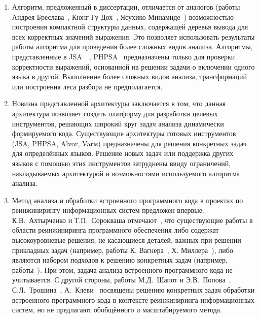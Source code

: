 \begin{enumerate}

\item Алгоритм, предложенный в диссертации, отличается от аналогов (работы Андрея Бреслава~\cite{Alvor1, Alvor2}, Кюнг-Гу Дох~\cite{LrAbstract1, LrAbstract2}, Ясухико Минамиде~\cite{PHPSA}) возможностью построения компактной структуры данных, содержащей деревья вывода для всех корректных значений выражения. Это позволяет использовать результаты работы алгоритма для проведения более сложных видов анализа. Алгоритмы, представленные в JSA~\cite{JSA}~\cite{Alvor1, Alvor2}, PHPSA~\cite{PHPSA} предназначены только для проверки корректности выражений, основанной на решении задачи о включении одного языка в другой. Выполнение более сложных видов анализа, трансформаций или построения леса разбора не предполагается. 

\item Новизна представленной архитектуры заключается в том, что данная архитектура позволяет создать платформу для разработки целевых инструментов, решающих широкий круг задач анализа динамически формируемого кода. Существующие архитектуры готовых инструментов (JSA, PHPSA, Alvor, Varis) предназначены для решения конкретных задач для определённых языков. Решение новых задач или поддержка других языков с помощью этих инструментов затруднены ввиду ограничений, накладываемых архитектурой и возможностями используемого алгоритма анализа. 

\item Метод анализа и обработки встроенного программного кода в проектах по реинжинирингу информационных систем предложен впервые. К.В.~Ахтырченко и Т.П.~Сорокваша отмечают~\cite{SoftwareReengMethods}, что существующие работы в области реинжиниринга программного обеспечения либо содержат высокоуровневые решения, не касающиеся деталей, важных при решении прикладных задач (например, работы К. Вагнера~\cite{SoftwareReeng3}, Х. Миллера~\cite{SoftwareReeng2}), либо являются набором подходов к решению конкретных задач (например, работы~\cite{SoftwareReeng1, reengANT, boulychev}). При этом, задача анализа встроенного программного кода не учитывается. С другой стороны, работы М.Д.~Шапот и Э.В.~Попова~\cite{DynamicDSQLTranslation}, С.Л.~Трошина~\cite{reengANT}, А.~Клеви~\cite{DSQLReverseEngineering}  посвящены решению конкретных задач обработки встроенного программного кода в контексте реинжиниринга информационных систем, но не предлагают обобщённого и масштабируемого метода.

\end{enumerate}


